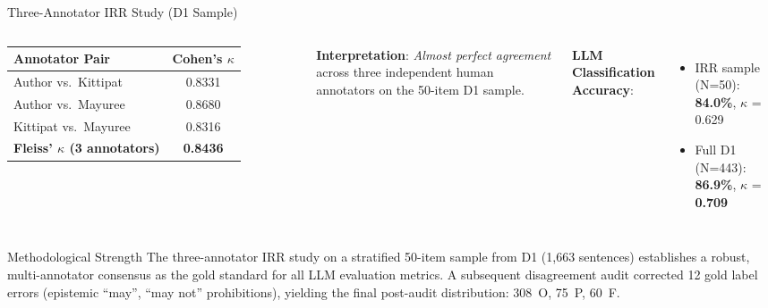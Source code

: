 \documentclass[aspectratio=169, 10pt]{beamer}
\begin{document}
\begin{frame}{Three-Annotator IRR Study (D1 Sample)}
    \begin{columns}
        \begin{table}[]
            \centering
            \small
            \begin{tabular}{lc}
                \toprule
                \textbf{Annotator Pair} & \textbf{Cohen's $\kappa$} \\
                \midrule
                Author vs.\ Kittipat & 0.8331 \\
                Author vs.\ Mayuree & 0.8680 \\
                Kittipat vs.\ Mayuree & 0.8316 \\
                \midrule
                \textbf{Fleiss' $\kappa$ (3 annotators)} & \textbf{0.8436} \\
                \bottomrule
            \end{tabular}
        \end{table}
        
        \textbf{Interpretation}: \textit{Almost perfect agreement} across three independent human annotators on the 50-item D1 sample.

        \vspace{0.3cm}
        \textbf{LLM Classification Accuracy}:
        \begin{itemize}
            \item IRR sample (N=50): \textbf{84.0\%}, $\kappa$ = 0.629
            \item Full D1 (N=443): \textbf{86.9\%}, $\kappa$ = \textbf{0.709}
        \end{itemize}
    \end{columns}

    \vspace{0.4cm}
    \begin{exampleblock}{Methodological Strength}
        The three-annotator IRR study on a stratified 50-item sample from D1 (1,663 sentences) establishes a robust, multi-annotator consensus as the gold standard for all LLM evaluation metrics. A subsequent disagreement audit corrected 12 gold label errors (epistemic ``may'', ``may not'' prohibitions), yielding the final post-audit distribution: 308~O, 75~P, 60~F.
    \end{exampleblock}
\end{frame}

\end{document}
